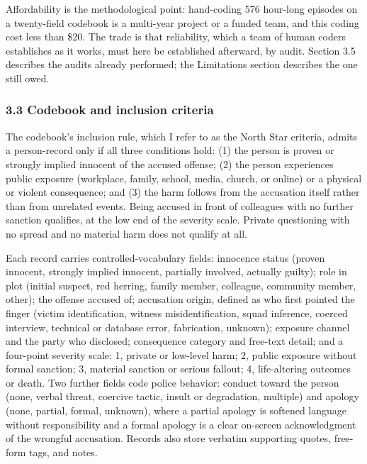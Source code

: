 \documentclass[
]{article}
\newcounter{none} %
\begin{document}
Affordability is the methodological point: hand-coding 576 hour-long
episodes on a twenty-field codebook is a multi-year project or a funded
team, and this coding cost less than \$20. The trade is that
reliability, which a team of human coders establishes as it works, must
here be established afterward, by audit. Section 3.5 describes the
audits already performed; the Limitations section describes the one
still owed.

\subsubsection{3.3 Codebook and inclusion
criteria}\label{codebook-and-inclusion-criteria}

The codebook's inclusion rule, which I refer to as the North Star
criteria, admits a person-record only if all three conditions hold: (1)
the person is proven or strongly implied innocent of the accused
offense; (2) the person experiences public exposure (workplace, family,
school, media, church, or online) or a physical or violent consequence;
and (3) the harm follows from the accusation itself rather than from
unrelated events. Being accused in front of colleagues with no further
sanction qualifies, at the low end of the severity scale. Private
questioning with no spread and no material harm does not qualify at all.

Each record carries controlled-vocabulary fields: innocence status
(proven innocent, strongly implied innocent, partially involved,
actually guilty); role in plot (initial suspect, red herring, family
member, colleague, community member, other); the offense accused of;
accusation origin, defined as who first pointed the finger (victim
identification, witness misidentification, squad inference, coerced
interview, technical or database error, fabrication, unknown); exposure
channel and the party who disclosed; consequence category and free-text
detail; and a four-point severity scale: 1, private or low-level harm;
2, public exposure without formal sanction; 3, material sanction or
serious fallout; 4, life-altering outcomes or death. Two further fields
code police behavior: conduct toward the person (none, verbal threat,
coercive tactic, insult or degradation, multiple) and apology (none,
partial, formal, unknown), where a partial apology is softened language
without responsibility and a formal apology is a clear on-screen
acknowledgment of the wrongful accusation. Records also store verbatim
supporting quotes, free-form tags, and notes.
\end{document}
